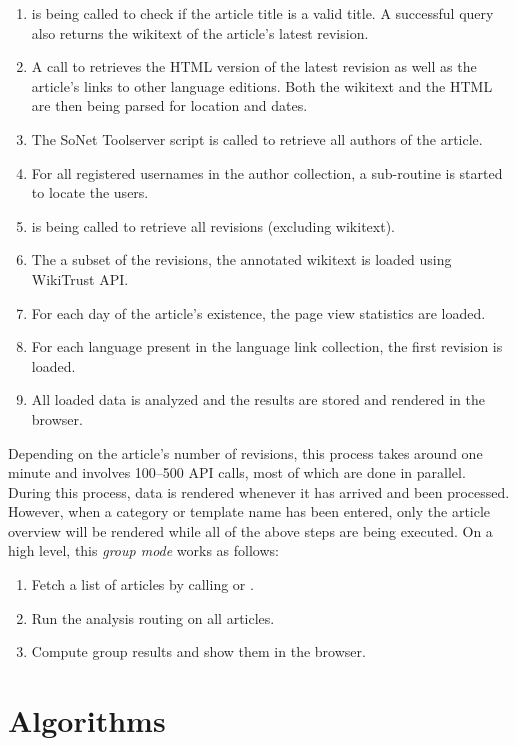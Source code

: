 \begin{enumerate}
	\item {} is being called to check if the article title is a valid title. 
	A successful query also returns the wikitext of the article's latest revision.
	\item A call to  retrieves the \ac{HTML} version of the latest revision as well as the article's links to other language editions. 
	Both the wikitext and the \ac{HTML} are then being parsed for location and dates.
	\item The SoNet Toolserver script is called to retrieve all authors of the article.
	\item For all registered usernames in the author collection, a sub-routine is started to locate the users. 
	\item {} is being called to retrieve all revisions (excluding wikitext). 
	\item The a subset of the revisions, the annotated wikitext is loaded using WikiTrust \ac{API}.
	\item For each day of the article's existence, the page view statistics are loaded.
	\item For each language present in the language link collection, the first revision is loaded.
	\item All loaded data is analyzed and the results are stored and rendered in the browser.
\end{enumerate}

Depending on the article's number of revisions, this process takes around one minute and involves 100--500 \ac{API} calls, most of which are done in parallel. 
During this process, data is rendered whenever it has arrived and been processed.
However, when a category or template name has been entered, only the article overview will be rendered while all of the above steps are being executed.
On a high level, this \emph{group mode} works as follows:

\begin{enumerate}
    \item Fetch a list of articles by calling  or .
    \item Run the analysis routing on all articles.
    \item Compute group results and show them in the browser.
\end{enumerate}


\section{Algorithms}\label{sec:algorithms}

